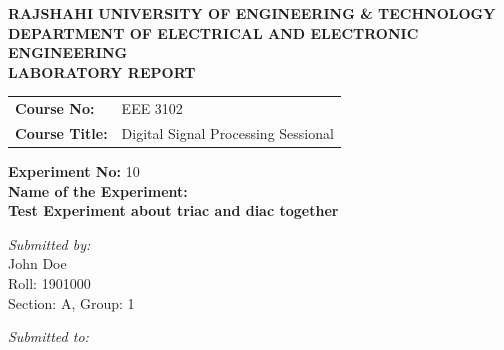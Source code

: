 \documentclass[12pt,a4paper]{article}
\begin{document}
\begin{titlepage}
    \sffamily
    \centering
    \vspace*{1cm}
    
    \Large \textbf{\MakeUppercase{ Rajshahi University of Engineering \& Technology }} \\
    \vspace{0.5cm}
    \large \textbf{\MakeUppercase{ Department of Electrical and Electronic Engineering }} \\
    
    \vspace{2.5cm}
    \Large \textbf{LABORATORY REPORT} \\
    \vspace{1cm}
    
    \begin{tabular}{ll}
        \textbf{Course No:} & EEE 3102 \\
        \textbf{Course Title:} & Digital Signal Processing Sessional \\
    \end{tabular}
    
    \vspace{2cm}
    
    \textbf{Experiment No:} 10 \\
    \vspace{0.5cm}
    \textbf{Name of the Experiment:} \\
    \Large \textbf{ Test Experiment about triac and diac together } \\
    
    \vspace{2.5cm}
    
    \begin{minipage}[t]{0.4\textwidth}
        \begin{flushleft} \large
            \emph{Submitted by:}\\
            John Doe \\
            Roll: 1901000 \\
            Section: A, Group: 1
        \end{flushleft}
    \end{minipage}
    \hfill
    \begin{minipage}[t]{0.5\textwidth}
        \begin{flushright} \large
            \emph{Submitted to:} \\
            

\end{flushright}
\end{minipage}
\end{titlepage}
\end{document}
